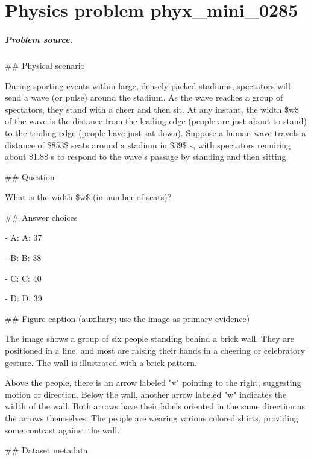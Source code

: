 
\chapter{Physics problem phyx\_mini\_0285}
\label{ch:PhyXMiniProblems_problem_phyx_mini_0285}

\paragraph{Problem source.}
\#\# Physical scenario

During sporting events within large, densely packed stadiums, spectators will send a wave (or pulse) around the stadium. As the wave reaches a group of spectators, they stand with a cheer and then sit. At any instant, the width \$w\$ of the wave is the distance from the leading edge (people are just about to stand) to the trailing edge (people have just sat down). Suppose a human wave travels a distance of \$853\$ seats around a stadium in \$39\$ s, with spectators requiring about \$1.8\$ s to respond to the wave's passage by standing and then sitting.

\#\# Question

What is the width \$w\$ (in number of seats)?

\#\# Answer choices

- A: A: 37

- B: B: 38

- C: C: 40

- D: D: 39

\#\# Figure caption (auxiliary; use the image as primary evidence)

The image shows a group of six people standing behind a brick wall. They are positioned in a line, and most are raising their hands in a cheering or celebratory gesture. The wall is illustrated with a brick pattern.

Above the people, there is an arrow labeled "v" pointing to the right, suggesting motion or direction. Below the wall, another arrow labeled "w" indicates the width of the wall. Both arrows have their labels oriented in the same direction as the arrows themselves. The people are wearing various colored shirts, providing some contrast against the wall.

\#\# Dataset metadata

